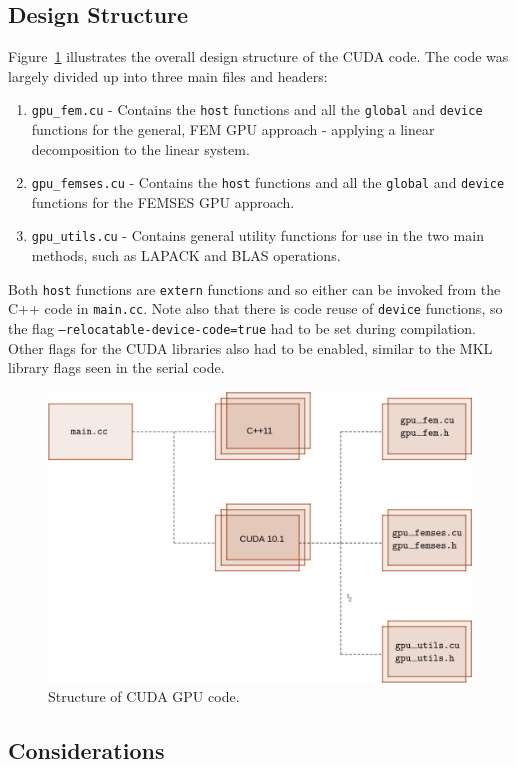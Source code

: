 \subsection{Design Structure}

Figure~\ref{fig:cuda} illustrates the overall design structure of the CUDA code. The code was largely divided up into three main files and headers:
\begin{enumerate}
	\item \texttt{gpu\_fem.cu} - Contains the \texttt{\twound host\twound} functions and all the \texttt{\twound global\twound} and \texttt{\twound device\twound} functions for the general, FEM GPU approach - applying a linear decomposition to the linear system.
	\item \texttt{gpu\_femses.cu} - Contains the \texttt{\twound host\twound} functions and all the \texttt{\twound global\twound} and \texttt{\twound device\twound} functions for the FEMSES GPU approach.
	\item \texttt{gpu\_utils.cu} - Contains general utility functions for use in the two main methods, such as LAPACK and BLAS operations.
\end{enumerate}
Both \texttt{\twound host\twound} functions are \texttt{extern} functions and so either can be invoked from the C++ code in \texttt{main.cc}. Note also that there is code reuse of \texttt{\twound device\twound} functions, so the flag \texttt{--relocatable-device-code=true} had to be set during compilation. Other flags for the CUDA libraries also had to be enabled, similar to the MKL library flags seen in the serial code.
\begin{figure}
	\centering
	\includegraphics[width = 0.7\linewidth]{Figures/cuda_code}
	\caption{Structure of CUDA GPU code.}
	\label{fig:cuda}
\end{figure}

\subsection{Considerations}

